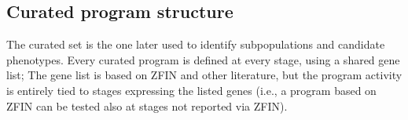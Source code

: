 \documentclass[11pt,a4paper]{article}
\begin{document}
\begin{table}[t]
	\centering
	\small
	
	\caption{Program sets: how programs relate across stages (Section~\ref{sec:program-sets}), programs and distinct genes per stage (range over stages), median genes per program, and distinct genes over all stages; het.: restricted to heterogeneous genes.}
	\label{tab:program-sets}
\end{table}

\subsection{Curated program structure}
\label{sec:program-structure}

The curated set is the one later used to identify subpopulations and candidate phenotypes. Every curated program is defined at every stage, using a shared gene list; The gene list is based on ZFIN and other literature, but the program activity is entirely tied to stages expressing the listed genes (i.e., a program based on ZFIN can be tested also at stages not reported via ZFIN). 
\end{document}
